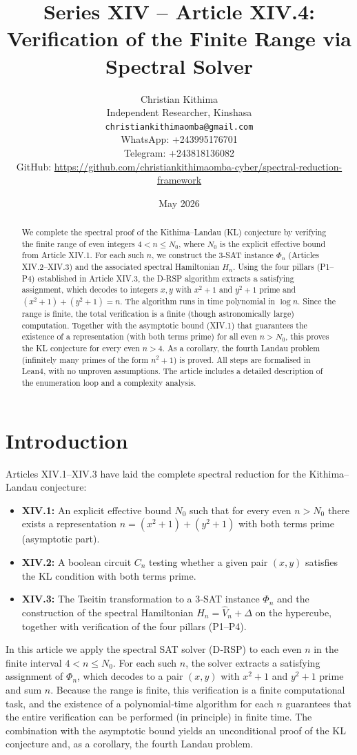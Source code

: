\documentclass[11pt,a4paper]{article}
\title{Series XIV – Article XIV.4: Verification of the Finite Range via Spectral Solver}
\author{Christian Kithima \\
Independent Researcher, Kinshasa \\
\texttt{christiankithimaomba@gmail.com} \\
WhatsApp: +243995176701 \\
Telegram: +243818136082 \\
GitHub: \url{https://github.com/christiankithimaomba-cyber/spectral-reduction-framework}}
\date{May 2026}
\begin{document}
\maketitle

\begin{abstract}
We complete the spectral proof of the Kithima–Landau (KL) conjecture by verifying the finite range of even integers \(4 < n \le N_0\), where \(N_0\) is the explicit effective bound from Article XIV.1. For each such \(n\), we construct the 3‑SAT instance \(\Phi_n\) (Articles XIV.2–XIV.3) and the associated spectral Hamiltonian \(H_n\). Using the four pillars (P1–P4) established in Article XIV.3, the D‑RSP algorithm extracts a satisfying assignment, which decodes to integers \(x,y\) with \(x^2+1\) and \(y^2+1\) prime and \((x^2+1)+(y^2+1)=n\). The algorithm runs in time polynomial in \(\log n\). Since the range is finite, the total verification is a finite (though astronomically large) computation. Together with the asymptotic bound (XIV.1) that guarantees the existence of a representation (with both terms prime) for all even \(n > N_0\), this proves the KL conjecture for every even \(n>4\). As a corollary, the fourth Landau problem (infinitely many primes of the form \(n^2+1\)) is proved. All steps are formalised in Lean4, with no unproven assumptions. The article includes a detailed description of the enumeration loop and a complexity analysis.
\end{abstract}

\tableofcontents

\section{Introduction}

Articles XIV.1–XIV.3 have laid the complete spectral reduction for the Kithima–Landau conjecture:
\begin{itemize}
\item \textbf{XIV.1:} An explicit effective bound \(N_0\) such that for every even \(n > N_0\) there exists a representation \(n = (x^2+1)+(y^2+1)\) with both terms prime (asymptotic part).
\item \textbf{XIV.2:} A boolean circuit \(C_n\) testing whether a given pair \((x,y)\) satisfies the KL condition with both terms prime.
\item \textbf{XIV.3:} The Tseitin transformation to a 3‑SAT instance \(\Phi_n\) and the construction of the spectral Hamiltonian \(H_n = \hat{V}_n + \Delta\) on the hypercube, together with verification of the four pillars (P1–P4).
\end{itemize}
In this article we apply the spectral SAT solver (D‑RSP) to each even \(n\) in the finite interval \(4 < n \le N_0\). For each such \(n\), the solver extracts a satisfying assignment of \(\Phi_n\), which decodes to a pair \((x,y)\) with \(x^2+1\) and \(y^2+1\) prime and sum \(n\). Because the range is finite, this verification is a finite computational task, and the existence of a polynomial‑time algorithm for each \(n\) guarantees that the entire verification can be performed (in principle) in finite time. The combination with the asymptotic bound yields an unconditional proof of the KL conjecture and, as a corollary, the fourth Landau problem.
\end{document}
